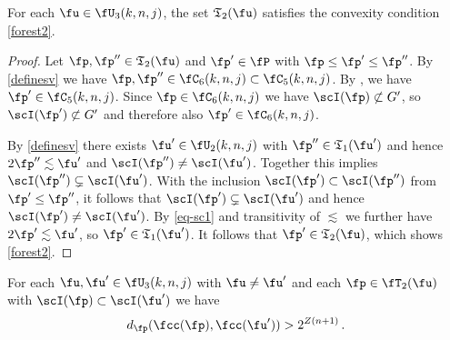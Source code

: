 \begin{lemma}
    \label{forest-convex}
    For each $\fu\in \fU_3(k,n,j)$,
    the set $\mathfrak{T}_2(\fu)$
    satisfies the convexity condition \eqref{forest2}.
\end{lemma}

\begin{proof}
    Let $\fp, \fp'' \in \mathfrak{T}_2(\fu)$ and $\fp' \in \fP$ with $\fp \le \fp' \le \fp''$. By \eqref{definesv} we have $\fp, \fp'' \in \fC_6(k,n,j) \subset \fC_5(k,n,j)$. By , we have $\fp' \in \fC_5(k,n,j)$. Since $\fp \in \fC_6(k,n,j)$ we have $\scI(\fp) \not \subset G'$, so $\scI(\fp') \not \subset G'$ and therefore also $\fp' \in \fC_6(k,n,j)$.

    By \eqref{definesv} there exists $\fu' \in \fU_2(k,n,j)$ with $\fp'' \in \mathfrak{T}_1(\fu')$ and hence $2\fp'' \lesssim \fu'$ and $\scI(\fp'') \ne \scI(\fu')$. Together this implies $\scI(\fp'') \subsetneq \scI(\fu')$. With the inclusion $\scI(\fp') \subset \scI(\fp'')$ from $\fp' \le \fp''$, it follows that $\scI(\fp') \subsetneq \scI(\fu')$ and hence $\scI(\fp') \ne \scI(\fu')$.
    By \eqref{eq-sc1} and transitivity of $\lesssim$ we further have $2\fp' \lesssim \fu'$, so $\fp' \in \mathfrak{T}_1(\fu')$.
    It follows that $\fp' \in \mathfrak{T}_2(\fu)$, which shows \eqref{forest2}.
\end{proof}

\begin{lemma}
    \label{forest-separation}
    For each $\fu,\fu'\in \fU_3(k,n,j)$ with $\fu\neq \fu'$ and each $\fp \in \fT_2(\fu)$
    with $\scI(\fp)\subset \scI(\fu')$ we have
    \begin{equation}
    d_{\fp}(\fcc(\fp), \fcc(\fu')) > 2^{Z(n+1)}\,.
    \end{equation}
\end{lemma}

